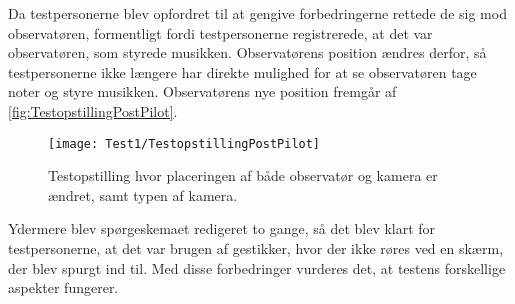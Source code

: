 Da testpersonerne blev opfordret til at gengive forbedringerne rettede de sig mod observatøren, formentligt fordi testpersonerne registrerede, at det var observatøren, som styrede musikken. Observatørens position ændres derfor, så testpersonerne ikke længere har direkte mulighed for at se observatøren tage noter og styre musikken. Observatørens nye position fremgår af \autoref{fig:TestopstillingPostPilot}.
\newpage 
%
\begin{figure}[H]
	\centering
	\texttt{[image: Test1/TestopstillingPostPilot]}
	\caption{Testopstilling hvor placeringen af både observatør og kamera er ændret, samt typen af kamera.}
	\label{fig:TestopstillingPostPilot}
\end{figure}
\noindent
% 
Ydermere blev spørgeskemaet redigeret to gange, så det blev klart for testpersonerne, at det var brugen af gestikker, hvor der ikke røres ved en skærm, der blev spurgt ind til. \blankline
%
Med disse forbedringer vurderes det, at testens forskellige aspekter fungerer.  
 

